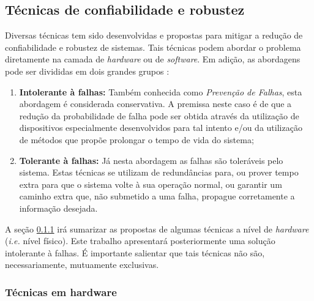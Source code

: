 \subsection{Técnicas de confiabilidade e robustez}
\label{subsection_Conf_tecnicas}
Diversas técnicas tem sido desenvolvidas e propostas para mitigar a redução de confiabilidade e robustez de sistemas. Tais técnicas podem abordar o problema diretamente na camada de \textit{hardware} ou de \textit{software}. Em adição, as abordagens pode ser divididas em dois grandes grupos \cite{Siewiorek1992}:
\begin{enumerate} 
\item \textbf{Intolerante à falhas:} Também conhecida como \textit{Prevenção de Falhas}, esta abordagem é considerada conservativa. A premissa neste caso é de que a redução da probabilidade de falha pode ser obtida através da utilização de dispositivos especialmente desenvolvidos para tal intento e/ou da utilização de métodos que propõe prolongar o tempo de vida do sistema;\item \textbf{Tolerante à falhas:} Já nesta abordagem as falhas são toleráveis pelo sistema. Estas técnicas se utilizam de redundâncias para, ou prover tempo extra para que o sistema volte à sua operação normal, ou garantir um caminho extra que, não submetido a uma falha, propague corretamente a informação desejada. 
\end{enumerate}

A seção \ref{subsubsection_tecnicas_hardware} irá sumarizar as propostas de algumas técnicas a nível de \textit{hardware} (\textit{i.e.} nível físico). Este trabalho apresentará posteriormente uma solução intolerante à falhas. É importante salientar que tais técnicas não são, necessariamente, mutuamente exclusivas.

\subsubsection{Técnicas em hardware}
\label{subsubsection_tecnicas_hardware}

